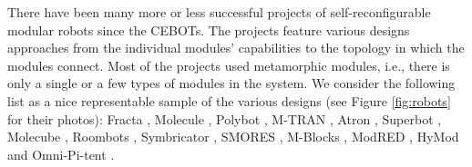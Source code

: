 There have been many more or less successful projects of self-reconfigurable
modular robots since the CEBOTs. The projects feature various designs approaches
from the individual modules' capabilities to the topology in which the modules
connect. Most of the projects used metamorphic modules, i.e., there is only a
single or a few types of modules in the system. We consider the following list
as a nice representable sample of the various designs (see Figure
\ref{fig:robots} for their photos): Fracta \cite{DBLP:conf/icra/MurataKK94},
Molecule \cite{DBLP:conf/icra/KotayRVM98}, Polybot
\cite{DBLP:conf/icra/YimDR00}, M-TRAN \cite{DBLP:conf/icarcv/KurokawaKYTMK02},
Atron \cite{DBLP:conf/iros/JorgensenOL04}, Superbot
\cite{DBLP:conf/iros/SalemiMS06}, Molecube \cite{DBLP:journals/trob/ZykovMDL07},
Roombots \cite{DBLP:conf/icra/SprowitzBDI09}, Symbricator
\cite{DBLP:journals/corr/abs-1109-2288}, SMORES \cite{DBLP:conf/iros/DaveyKY12},
M-Blocks \cite{DBLP:conf/iros/RomanishinGR13}, ModRED
\cite{DBLP:journals/ras/BacaHDND14}, HyMod \cite{DBLP:conf/dars/ParrottDG16} and
Omni-Pi-tent \cite{DBLP:conf/taros/PeckTT19}.

